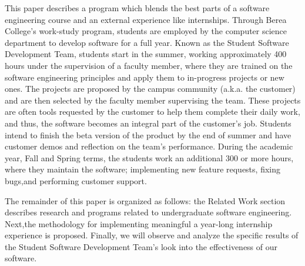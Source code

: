 This paper describes a program which blends the best parts of a software engineering course and an external experience like internships. Through Berea College's work-study program, students are employed by the computer science department to develop software for a full year. Known as the Student Software Development Team, students start in the summer, working approximately 400 hours under the supervision of a faculty member, where they are trained on the software engineering principles and apply them to in-progress projects or new ones. The projects are proposed by the campus community (a.k.a. the customer) and are then selected by the faculty member supervising the team. These projects are often tools requested by the customer to help them complete their daily work, and thus, the software becomes an integral part of the customer’s job. Students intend to finish the beta version of the product by the end of summer and have customer demos and reflection on the team's performance. During the academic year, Fall and Spring terms, the students work an additional 300 or more hours, where they maintain the software; implementing new feature requests, fixing bugs,and performing customer support.

The remainder of this paper is organized as follows: the Related Work section describes research and programs related to undergraduate software engineering. Next,the methodology for implementing meaningful a year-long internship experience is proposed. Finally, we will observe and analyze the specific results of the Student Software Development Team's look into the effectiveness of our software.

